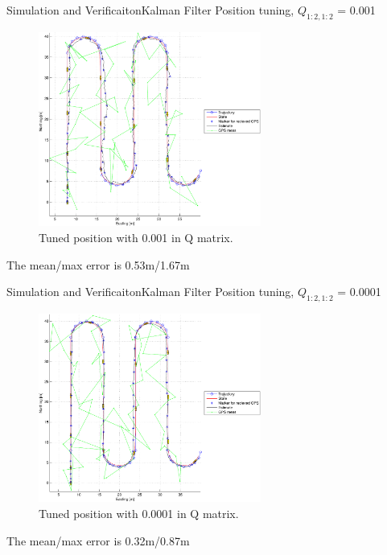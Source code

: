 \documentclass[10pt,handout]{beamer}
\begin{document}
\begin{frame}{Simulation and Verificaiton}{Kalman Filter}
Position tuning, $Q_{1:2,1:2}$ = 0.001
  \begin{figure}
    \includegraphics[width=0.65\textwidth]{../../code/matlab/q0,001}
    \caption{\scriptsize Tuned position with 0.001 in Q matrix.}
    \label{fig:q0.001}
  \end{figure}
  The mean/max error is 0.53m/1.67m
\end{frame}

\begin{frame}{Simulation and Verificaiton}{Kalman Filter}
Position tuning, $Q_{1:2,1:2}$ = 0.0001
  \begin{figure}
    \includegraphics[width=0.65\textwidth]{../../code/matlab/q0,0001}
    \caption{\scriptsize Tuned position with 0.0001 in Q matrix.}
    \label{fig:q0.0001}
  \end{figure}
  The mean/max error is 0.32m/0.87m
\end{frame}
\end{document}
